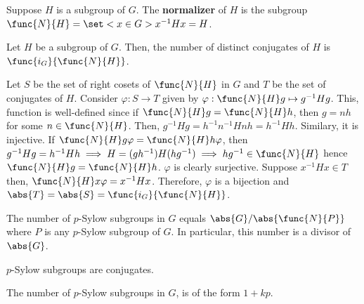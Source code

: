 \begin{definition}
    Suppose \(H\) is a subgroup of \(G\). The \textbf{normalizer} of \(H\) is the subgroup \(\func{N}{H}= \set<x \in G>{x^{-1}Hx = H}\).
\end{definition}

\begin{lemma}
    Let \(H\) be a subgroup of \(G\). Then, the number of distinct conjugates of \(H\) is \(\func{i_G}{\func{N}{H}}\).
\end{lemma}

\begin{prooflemma}
    Let \(S\) be the set of right cosets of \(\func{N}{H}\) in \(G\) and \(T\) be the set of conjugates of \(H\). Consider \(\varphi : S \to T\) given by \(\varphi: \func{N}{H}g \mapsto g^{-1}Hg\). This, function is well-defined since if \(\func{N}{H}g = \func{N}{H}h\), then \(g = nh\) for some \(n \in \func{N}{H}\). Then, \(g^{-1}Hg = h^{-1}n^{-1}Hnh = h^{-1}Hh\). Similary, it is injective. If \(\func{N}{H}g \varphi = \func{N}{H}h \varphi\), then \(g^{-1}Hg = h^{-1}H h \implies H =(gh^{-1})H (hg^{-1}) \implies hg^{-1} \in \func{N}{H}\) hence \(\func{N}{H}g = \func{N}{H}h\). \(\varphi\) is clearly surjective. Suppose \(x^{-1}Hx\in T\) then, \(\func{N}{H}x \varphi = x^{-1}Hx\). Therefore, \(\varphi\) is a bijection and \(\abs{T} =\abs{S} =  \func{i_G}{\func{N}{H}}\).
\end{prooflemma}

\begin{corollary}
    The number of \(p\)-Sylow subgroups in \(G\) equals \(\abs{G}/\abs{\func{N}{P}}\) where \(P\) is any \(p\)-Sylow subgroup of \(G\). In particular, this number is a divisor of \(\abs{G}\).
\end{corollary}

\begin{prooflemma}
    \(p\)-Sylow subgroups are conjugates.
\end{prooflemma}

\begin{theorem}
    The number of \(p\)-Sylow subgroups in \(G\), is of the form \(1 + kp\).
\end{theorem}

